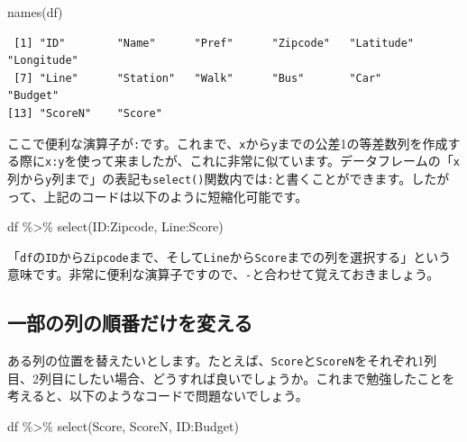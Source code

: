 \documentclass[
  a4paper,
  pandoc,
  ja=standard,
  jafont=haranoaji]{bxjsbook}
\newenvironment{Shaded}{\begin{snugshade}}{\end{snugshade}}
\newcommand{\FunctionTok}[1]{\textcolor[rgb]{0.28,0.35,0.67}{#1}}
\newcommand{\NormalTok}[1]{\textcolor[rgb]{0.00,0.48,0.65}{#1}}
\newcommand{\SpecialCharTok}[1]{\textcolor[rgb]{0.37,0.37,0.37}{#1}}
\begin{document}
\begin{Shaded}
\begin{Highlighting}[numbers=left,,]
\FunctionTok{names}\NormalTok{(df)}
\end{Highlighting}
\end{Shaded}

\begin{verbatim}
 [1] "ID"        "Name"      "Pref"      "Zipcode"   "Latitude"  "Longitude"
 [7] "Line"      "Station"   "Walk"      "Bus"       "Car"       "Budget"   
[13] "ScoreN"    "Score"    
\end{verbatim}

ここで便利な演算子が\texttt{:}です。これまで、\texttt{x}から\texttt{y}までの公差1の等差数列を作成する際に\texttt{x:y}を使って来ましたが、これに非常に似ています。データフレームの「\texttt{x}列から\texttt{y}列まで」の表記も\texttt{select()}関数内では\texttt{:}と書くことができます。したがって、上記のコードは以下のように短縮化可能です。

\begin{Shaded}
\begin{Highlighting}[numbers=left,,]
\NormalTok{df }\SpecialCharTok{\%\textgreater{}\%}
  \FunctionTok{select}\NormalTok{(ID}\SpecialCharTok{:}\NormalTok{Zipcode, Line}\SpecialCharTok{:}\NormalTok{Score)}
\end{Highlighting}
\end{Shaded}

「\texttt{df}の\texttt{ID}から\texttt{Zipcode}まで、そして\texttt{Line}から\texttt{Score}までの列を選択する」という意味です。非常に便利な演算子ですので、\texttt{-}と合わせて覚えておきましょう。

\hypertarget{ux4e00ux90e8ux306eux5217ux306eux9806ux756aux3060ux3051ux3092ux5909ux3048ux308b}{%
\subsection{一部の列の順番だけを変える}\label{ux4e00ux90e8ux306eux5217ux306eux9806ux756aux3060ux3051ux3092ux5909ux3048ux308b}}

ある列の位置を替えたいとします。たとえば、\texttt{Score}と\texttt{ScoreN}をそれぞれ1列目、2列目にしたい場合、どうすれば良いでしょうか。これまで勉強したことを考えると、以下のようなコードで問題ないでしょう。

\begin{Shaded}
\begin{Highlighting}[numbers=left,,]
\NormalTok{df }\SpecialCharTok{\%\textgreater{}\%}
  \FunctionTok{select}\NormalTok{(Score, ScoreN, ID}\SpecialCharTok{:}\NormalTok{Budget)}
\end{Highlighting}
\end{Shaded}
\end{document}
